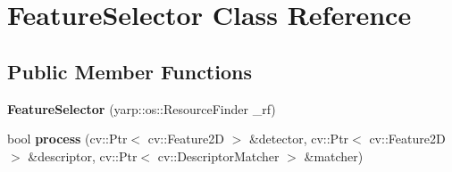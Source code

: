 \hypertarget{classFeatureSelector}{}\section{Feature\+Selector Class Reference}
\label{classFeatureSelector}
\subsection*{Public Member Functions}
\begin{DoxyCompactItemize}
\item 
{\bfseries Feature\+Selector} (yarp\+::os\+::\+Resource\+Finder \+\_\+rf)\hypertarget{classFeatureSelector_a363371620000b919b60deb13e00bb743}{}\label{classFeatureSelector_a363371620000b919b60deb13e00bb743}

\item 
bool {\bfseries process} (cv\+::\+Ptr$<$ cv\+::\+Feature2D $>$ \&detector, cv\+::\+Ptr$<$ cv\+::\+Feature2D $>$ \&descriptor, cv\+::\+Ptr$<$ cv\+::\+Descriptor\+Matcher $>$ \&matcher)\hypertarget{classFeatureSelector_a543c2e9e54d6d1d3a6de7db5c19e3763}{}\label{classFeatureSelector_a543c2e9e54d6d1d3a6de7db5c19e3763}

\end{DoxyCompactItemize}
